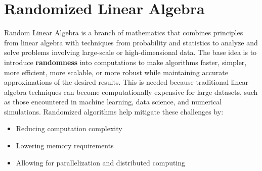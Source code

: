 \documentclass[11pt,a4paper]{article}
\begin{document}
\section{Randomized Linear Algebra}
Random Linear Algebra is a branch of mathematics that combines principles from linear algebra with techniques from probability and statistics to analyze and solve problems involving large-scale or high-dimensional data. The base idea is to introduce \textbf{randomness} into computations to make algorithms faster, simpler, more efficient, more scalable, or more robust while maintaining accurate approximations of the desired results. This is needed because traditional linear algebra techniques can become computationally expensive for large datasets, such as those encountered in machine learning, data science, and numerical simulations. Randomized algorithms help mitigate these challenges by:
\begin{itemize}
    \item Reducing computation complexity
    \item Lowering memory requirements
    \item Allowing for parallelization and distributed computing
\end{itemize}
\end{document}
